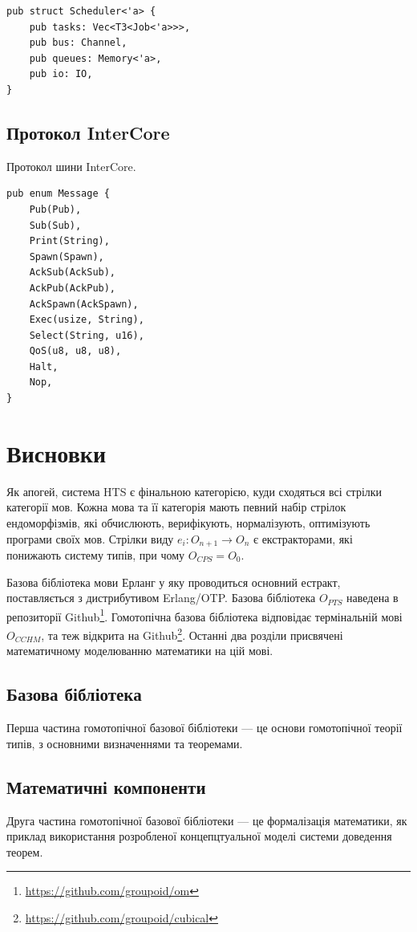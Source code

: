 \begin{lstlisting}
pub struct Scheduler<'a> {
    pub tasks: Vec<T3<Job<'a>>>,
    pub bus: Channel,
    pub queues: Memory<'a>,
    pub io: IO,
}
\end{lstlisting}

\subsection{Протокол InterCore}
Протокол шини InterCore.

\begin{lstlisting}
pub enum Message {
    Pub(Pub),
    Sub(Sub),
    Print(String),
    Spawn(Spawn),
    AckSub(AckSub),
    AckPub(AckPub),
    AckSpawn(AckSpawn),
    Exec(usize, String),
    Select(String, u16),
    QoS(u8, u8, u8),
    Halt,
    Nop,
}
\end{lstlisting}

\section{Висновки}
Як апогей, система HTS є фінальною категорією,
куди сходяться всі стрілки категорії мов. Кожна мова та її категорія
мають певний набір стрілок ендоморфізмів, які обчислюють, верифікують,
нормалізують, оптимізують програми своїх мов.
Стрілки виду $e_i: O_{n+1} \rightarrow O_n$ є екстракторами, які понижають систему типів,
при чому $O_{CPS} = O_0$.

Базова бібліотека мови Ерланг у яку проводиться основний
естракт, поставляється з дистрибутивом Erlang/OTP. Базова бібліотека
$O_{PTS}$ наведена в репозиторії Github\footnote{\url{https://github.com/groupoid/om}}.
Гомотопічна базова бібліотека відповідає термінальній мові $O_{CCHM}$, та теж відкрита
на Github\footnote{\url{https://github.com/groupoid/cubical}}.
Останні два розділи присвячені математичному моделюванню математики на цій мові.

\subsection{Базова бібліотека}
Перша частина гомотопічної базової бібліотеки --- це основи гомотопічної теорії типів,
з основними визначеннями та теоремами.

\subsection{Математичні компоненти}
Друга частина гомотопічної базової бібліотеки --- це формалізація математики, як
приклад використання розробленої концепцтуальної моделі системи доведення теорем.

